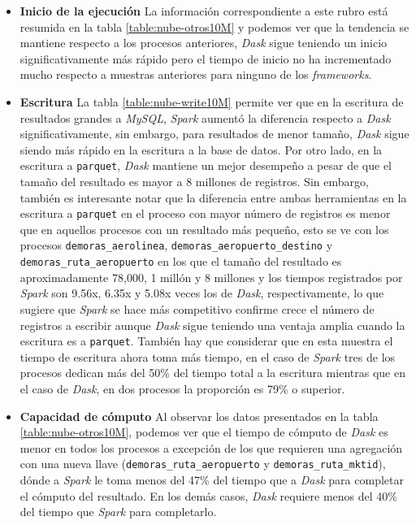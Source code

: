 \begin{itemize}
	\item \textbf{Inicio de la ejecución} La información correspondiente a este rubro está resumida en la tabla \ref{table:nube-otros10M} y podemos ver que la tendencia se mantiene respecto a los procesos anteriores, \textit{Dask} sigue teniendo un inicio significativamente más rápido pero el tiempo de inicio no ha incrementado mucho respecto a muestras anteriores para ninguno de los \textit{frameworks}.
	
	\item \textbf{Escritura} La tabla \ref{table:nube-write10M} permite ver que en la escritura de resultados grandes a \textit{MySQL}, \textit{Spark} aumentó la diferencia respecto a \textit{Dask} significativamente, sin embargo, para resultados de menor tamaño, \textit{Dask} sigue siendo más rápido en la escritura a la base de datos. Por otro lado, en la escritura a \texttt{parquet}, \textit{Dask} mantiene un mejor desempeño a pesar de que el tamaño del resultado es mayor a 8 millones de registros. Sin embargo, también es interesante notar que la diferencia entre ambas herramientas en la escritura a \texttt{parquet} en el proceso con mayor número de registros es menor que en aquellos procesos con un resultado más pequeño, esto se ve con los procesos  \texttt{demoras\_aerolinea}, \texttt{demoras\_aeropuerto\_destino} y \texttt{demoras\_ruta\_aeropuerto} en los que el tamaño del resultado es aproximadamente 78,000, 1 millón y 8 millones y los tiempos registrados por \textit{Spark} son 9.56x, 6.35x y 5.08x veces los de \textit{Dask}, respectivamente, lo que sugiere que \textit{Spark} se hace más competitivo confirme crece el número de registros a escribir aunque \textit{Dask} sigue teniendo una ventaja amplia cuando la escritura es a \texttt{parquet}. También hay que considerar que en esta muestra el tiempo de escritura ahora toma más tiempo, en el caso de \textit{Spark} tres de los procesos dedican más del 50\% del tiempo total a la escritura mientras que en el caso de \textit{Dask}, en dos procesos la proporción es 79\% o superior.
	
	\item \textbf{Capacidad de cómputo} Al observar los datos presentados en la tabla \ref{table:nube-otros10M}, podemos ver que el tiempo de cómputo de \textit{Dask} es menor en todos los procesos a excepción de los que requieren una agregación con una nueva llave (\texttt{demoras\_ruta\_aeropuerto} y \texttt{demoras\_ruta\_mktid}), dónde a \textit{Spark} le toma menos del 47\% del tiempo que a \textit{Dask} para completar el cómputo del resultado. En los demás casos, \textit{Dask} requiere menos del 40\% del tiempo que \textit{Spark} para completarlo. 
	

\end{itemize}
